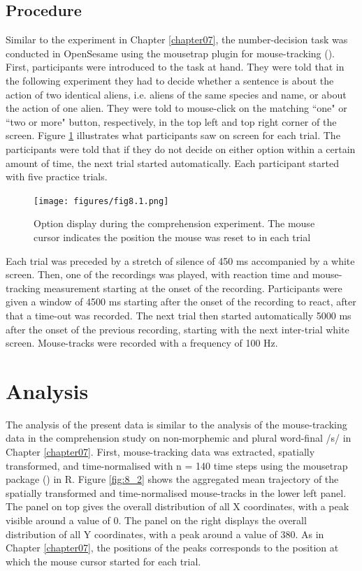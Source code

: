 \subsection{Procedure}\label{section08_1_3}

Similar to the experiment in Chapter \ref{chapter07}, the number-decision task was conducted in OpenSesame using the mousetrap plugin for mouse-tracking (\cite{Kieslich2017}). First, participants were introduced to the task at hand. They were told that in the following experiment they had to decide whether a sentence is about the action of two identical aliens, i.e. aliens of the same species and name, or about the action of one alien. They were told to mouse-click on the matching ``one" or ``two or more" button, respectively, in the top left and top right corner of the screen. Figure \ref{fig:8_1} illustrates what participants saw on screen for each trial. The participants were told that if they do not decide on either option within a certain amount of time, the next trial started automatically. Each participant started with five practice trials.

\begin{figure}
    \centering
    \texttt{[image: figures/fig8.1.png]}
    \caption{Option display during the comprehension experiment. The mouse cursor indicates the position the mouse was reset to in each trial}
    \label{fig:8_1}
\end{figure}

Each trial was preceded by a stretch of silence of 450 ms accompanied by a white screen. Then, one of the recordings was played, with reaction time and mouse-tracking measurement starting at the onset of the recording. Participants were given a window of 4500 ms starting after the onset of the recording to react, after that a time-out was recorded. The next trial then started automatically 5000 ms after the onset of the previous recording, starting with the next inter-trial white screen. Mouse-tracks were recorded with a frequency of 100 Hz.

\section{Analysis}\label{section08_2}

The analysis of the present data is similar to the analysis of the mouse-tracking data in the comprehension study on non-morphemic and plural word-final /s/ in Chapter \ref{chapter07}. First, mouse-tracking data was extracted, spatially transformed, and time-normalised with n = 140 time steps using the mousetrap package (\cite{Kieslich2019}) in R. Figure \ref{fig:8_2} shows the aggregated mean trajectory of the spatially transformed and time-normalised mouse-tracks in the lower left panel. The panel on top gives the overall distribution of all X coordinates, with a peak visible around a value of $0$. The panel on the right displays the overall distribution of all Y coordinates, with a peak around a value of $380$. As in Chapter \ref{chapter07}, the positions of the peaks corresponds to the position at which the mouse cursor started for each trial.


